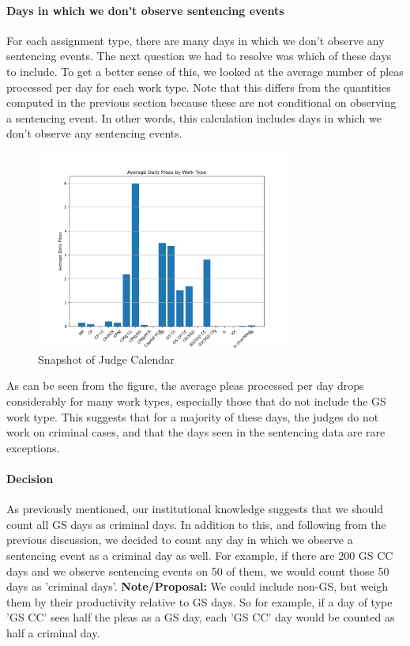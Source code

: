 \documentclass[11pt]{article}
\theoremstyle{ModifiedStyle}
\theoremstyle{ModifiedStyle}
\begin{document}
    \paragraph{Days in which we don't observe sentencing events}
      For each assignment type, there are many days in which we don't observe any sentencing events. The next question we had to resolve was which of these days to include. To get a better sense of this, we looked at the average number of pleas processed per day for each work type. Note that this differs from the quantities computed in the previous section because these are not conditional on observing a sentencing event. In other words, this calculation includes days in which we don't observe any sentencing events.

      \begin{figure}[H]
          \centering
          \caption{Snapshot of Judge Calendar}
          \label{fig-cond}
          \includegraphics[width=0.75\textwidth, keepaspectratio=true]{../../output/figures/Exploration/avg_pleas_by_worktype.png}
        \end{figure}

      As can be seen from the figure, the average pleas processed per day drops considerably for many work types, especially those that do not include the GS work type. This suggests that for a majority of these days, the judges do not work on criminal cases, and that the days seen in the sentencing data are rare exceptions.

      \paragraph{Decision}
        As previously mentioned, our institutional knowledge suggests that we should count all GS days as criminal days. In addition to this, and following from the previous discussion, we decided to count any day in which we observe a sentencing event as a criminal day as well. For example, if there are 200 GS CC days and we observe sentencing events on 50 of them, we would count those 50 days as 'criminal days'. \textbf{Note/Proposal:} We could include non-GS, but weigh them by their productivity relative to GS days. So for example, if a day of type 'GS CC' sees half the pleas as a GS day, each 'GS CC' day would be counted as half a criminal day.
\end{document}
